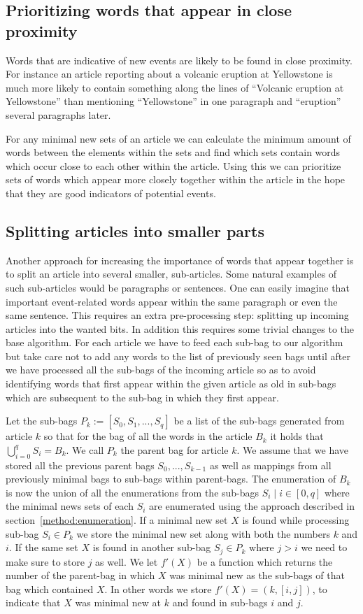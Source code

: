 \subsection{Prioritizing words that appear in close proximity}
Words that are indicative of new events are likely to be found in close proximity. For instance an article reporting about a volcanic eruption at Yellowstone is much more likely to contain something along the lines of ``Volcanic eruption at Yellowstone'' than mentioning ``Yellowstone'' in one paragraph and ``eruption'' several paragraphs later.

For any minimal new sets of an article we can calculate the minimum amount of words between the elements within the sets and find which sets contain words which occur close to each other within the article. Using this we can prioritize sets of words which appear more closely together within the article in the hope that they are good indicators of potential events.

\subsection{Splitting articles into smaller parts}
Another approach for increasing the importance of words that appear together is to split an article into several smaller, sub-articles. Some natural examples of such sub-articles would be paragraphs or sentences. One can easily imagine that important event-related words appear within the same paragraph or even the same sentence. This requires an extra pre-processing step: splitting up incoming articles into the wanted bits. In addition this requires some trivial changes to the base algorithm. For each article we have to feed each sub-bag to our algorithm but take care not to add any words to the list of previously seen bags until after we have processed all the sub-bags of the incoming article so as to avoid identifying words that first appear within the given article as old in sub-bags which are subsequent to the sub-bag in which they first appear.

Let the sub-bags $P_{k} := [S_{0}, S_{1},...,S_{q}]$ be a list of the sub-bags generated from article $k$ so that for the bag of all the words in the article $B_{k}$ it holds that $\bigcup_{i=0}^{q}S_{i} = B_{k}$. We call $P_{k}$ the parent bag for article $k$. We assume that we have stored all the previous parent bags $S_{0},...,S_{k-1}$ as well as mappings from all previously minimal bags to sub-bags within parent-bags. The enumeration of $B_{k}$ is now the union of all the enumerations from the sub-bags $S_{i} \mid i \in [0,q]$ where the minimal news sets of each $S_{i}$ are enumerated using the approach described in section~\ref{method:enumeration}. If a minimal new set $X$ is found while processing sub-bag $S_{i} \in P_{k}$ we store the minimal new set along with both the numbers $k$ and $i$. If the same set $X$ is found in another sub-bag $S_{j} \in P_{k}$ where $j>i$ we need to make sure to store $j$ as well. We let $f'(X)$ be a function which returns the number of the  parent-bag in which $X$ was minimal new as the sub-bags of that bag which contained $X$. In other words we store $f'(X) = (k, [i,j])$, to indicate that $X$ was minimal new at $k$ and found in sub-bags $i$ and $j$. 


